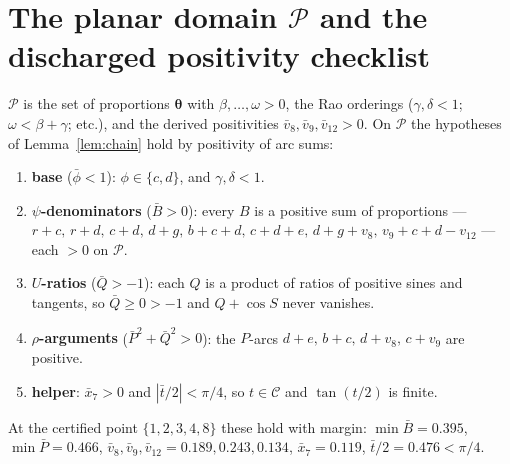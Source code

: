 \documentclass[11pt]{article}
\theoremstyle{definition}\newtheorem{definition}{Definition}\newtheorem{remark}{Remark}
\begin{document}
\appendix
\section{The planar domain $\mathcal P$ and the discharged positivity checklist}
$\mathcal P$ is the set of proportions $\boldsymbol\theta$ with $\beta,\dots,\omega>0$,
the Rao orderings ($\gamma,\delta<1$; $\omega<\beta+\gamma$; etc.), and the derived
positivities $\bar v_8,\bar v_9,\bar v_{12}>0$. On $\mathcal P$ the hypotheses of
Lemma~\ref{lem:chain} hold by positivity of arc sums:
\begin{enumerate}\itemsep1pt
\item \textbf{base} ($\bar\phi<1$): $\phi\in\{c,d\}$, and $\gamma,\delta<1$.
\item \textbf{$\psi$-denominators} ($\bar B>0$): every $B$ is a positive sum of
proportions --- $r{+}c,\,r{+}d,\,c{+}d,\,d{+}g,\,b{+}c{+}d,\,c{+}d{+}e,\,d{+}g{+}v_8,\,
v_9{+}c{+}d{-}v_{12}$ --- each $>0$ on $\mathcal P$.
\item \textbf{$U$-ratios} ($\bar Q>-1$): each $Q$ is a product of ratios of positive
sines and tangents, so $\bar Q\ge0>-1$ and $Q+\cos S$ never vanishes.
\item \textbf{$\rho$-arguments} ($\bar P^2+\bar Q^2>0$): the $P$-arcs
$d{+}e,\,b{+}c,\,d{+}v_8,\,c{+}v_9$ are positive.
\item \textbf{helper}: $\bar x_7>0$ and $|\bar t/2|<\pi/4$, so $t\in\mathcal C$ and
$\tan(t/2)$ is finite.
\end{enumerate}
At the certified point $\{1,2,3,4,8\}$ these hold with margin: $\min\bar B=0.395$,
$\min\bar P=0.466$, $\bar v_8,\bar v_9,\bar v_{12}=0.189,0.243,0.134$, $\bar x_7=0.119$,
$\bar t/2=0.476<\pi/4$.
\end{document}
